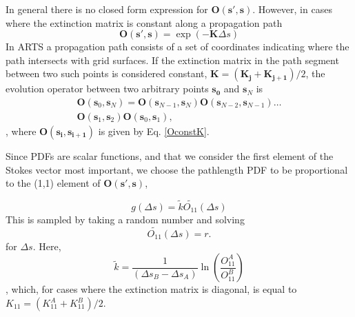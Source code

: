 In general there is no closed form expression for $\mathbf{O(s',s)}$.
However, in cases where the extinction matrix is constant along a
propagation path
\begin{equation}
\mathbf{O(s',s)}=\exp\left(-\mathbf{K}\Delta s\right)
\label{OconstK}
\end{equation}
In ARTS a propagation path consists of a set of coordinates
indicating where the path intersects with grid surfaces.  If the
extinction matrix in the path segment between two such points is
considered constant, $\mathbf{K}=(\mathbf{K_j}+\mathbf{K_{j+1}})/2$,
the evolution operator between two arbitrary points $\mathbf{s_0}$ and
$\mathbf{s}_N$ is
\begin{eqnarray}
\mathbf{O}(\mathbf{s}_0,\mathbf{s}_N) =
\mathbf{O}(\mathbf{s}_{N-1},\mathbf{s}_N)
\mathbf{O}(\mathbf{s}_{N-2},\mathbf{s}_{N-1}) \dots \nonumber\\
\mathbf{O}(\mathbf{s}_1,\mathbf{s}_2)\mathbf{O}(\mathbf{s}_0,\mathbf{s}_1),
\label{Ogeneral}
\end{eqnarray}
, where $\mathbf{O(s_i,s_{i+1})}$ is given by Eq. \ref{OconstK}.

Since PDFs are scalar functions, and that we consider the first element of the
Stokes vector most important, we choose the pathlength PDF to be proportional to the
(1,1) element of $\mathbf{O(s',s)}$,

\begin{equation}
g(\Delta s)=\tilde{k}\tilde{O_{11}}(\Delta s)
\label{gDeltas}
\end{equation}
This is sampled by taking a random number and solving 
\begin{equation}
\tilde{O_{11}}(\Delta s)=r.
\label{solvefor0}
\end{equation}
for $\Delta s$.  Here, 
\begin{equation}
\tilde{k}=\frac{1}{\left(\Delta s_B-\Delta s_A\right)}
\ln\left(\frac{O_{11}^A}{O_{11}^B}\right)
\end{equation}
, which, for cases where the extinction matrix is diagonal, is equal to $K_{11}=(K_{11}^A+K_{11}^B)/2$.

